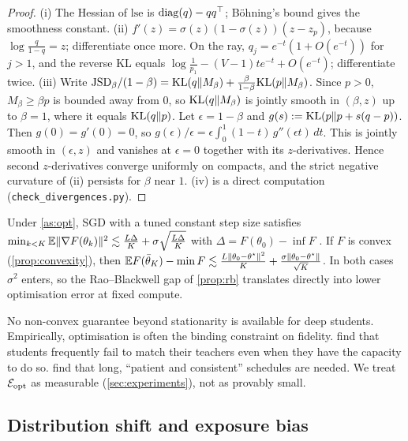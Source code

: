 \begin{proof}
(i) The Hessian of $\mathrm{lse}$ is $\operatorname{diag}(q)-qq^\top$; Böhning's bound gives the smoothness constant.
(ii) $f'(z)=\sigma(z)(1-\sigma(z))(z-z_p)$, because $\log\frac{q}{1-q}=z$; differentiate once more. On the ray,
$q_j=e^{-t}(1+O(e^{-t}))$ for $j>1$, and the reverse KL equals $\log\frac1{p_1}-(V-1)te^{-t}+O(e^{-t})$; differentiate twice.
(iii) Write $\mathrm{JSD}_\beta/(1-\beta)=\mathrm{KL}(q\|M_\beta)+\frac{\beta}{1-\beta}\mathrm{KL}(p\|M_\beta)$. Since $p>0$, $M_\beta\ge\beta p$ is bounded away
from $0$, so $\mathrm{KL}(q\|M_\beta)$ is jointly smooth in $(\beta,z)$ up to $\beta=1$, where it equals $\mathrm{KL}(q\|p)$. Let
$\epsilon=1-\beta$ and $g(s):=\mathrm{KL}(p\|p+s(q-p))$. Then $g(0)=g'(0)=0$, so $g(\epsilon)/\epsilon=\epsilon\int_0^1(1-t)\,g''(\epsilon t)\,dt$. This is
jointly smooth in $(\epsilon,z)$ and vanishes at $\epsilon=0$ together with its $z$-derivatives. Hence second
$z$-derivatives converge uniformly on compacts, and the strict negative curvature of (ii) persists for
$\beta$ near $1$. (iv) is a direct computation
(\texttt{check\_divergences.py}).
\end{proof}

\begin{theorem}\label{thm:sgd}
\Kn Under \cref{as:opt}, SGD with a tuned constant step size satisfies
$\min_{k<K}\mathbb{E}\|\nabla F(\theta_k)\|^2\lesssim\frac{L\Delta}K+\sigma\sqrt{\frac{L\Delta}K}$ with
$\Delta=F(\theta_0)-\inf F$ \citep{ghadimi2013stochastic}. If $F$ is convex (\cref{prop:convexity}), then
$\mathbb{E} F(\bar\theta_K)-\min F\lesssim\frac{L\|\theta_0-\theta^\star\|^2}K+\frac{\sigma\|\theta_0-\theta^\star\|}{\sqrt K}$.
In both cases $\sigma^2$ enters, so the Rao--Blackwell gap of \cref{prop:rb} translates directly into
lower optimisation error at fixed compute.
\end{theorem}
\begin{remark}
No non-convex guarantee beyond stationarity is available for deep students. Empirically, optimisation
is often the binding constraint on fidelity. \citet{stanton2021does} find that students frequently fail to
match their teachers even when they have the capacity to do so. \citet{beyer2022knowledge} find that long,
``patient and consistent'' schedules are needed. We treat $\mathcal{E}_{\mathrm{opt}}$ as measurable
(\cref{sec:experiments}), not as provably small.
\end{remark}

\subsection{Distribution shift and exposure bias}\label{sec:shift}

